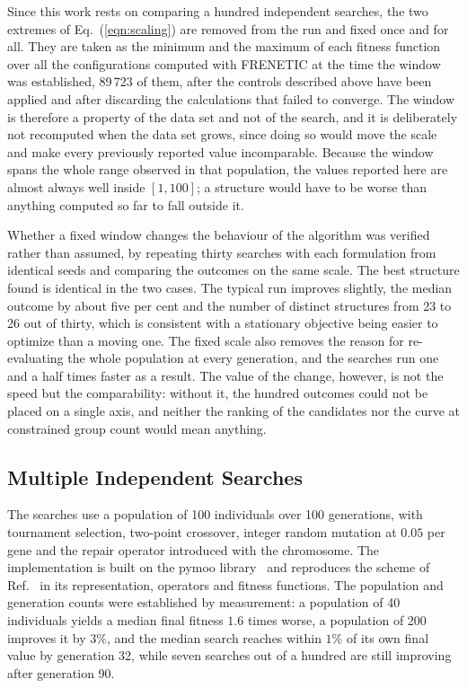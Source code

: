 \documentclass{style/nseJournal}
\begin{document}
Since this work rests on comparing a hundred independent searches, the two
extremes of Eq.~(\ref{eqn:scaling}) are removed from the run and fixed once and
for all. They are taken as the minimum and the maximum of each fitness function
over all the configurations computed with FRENETIC at the time the window was
established, 89\,723 of them, after the controls described above have been
applied and after discarding the calculations that failed to converge. The
window is therefore a property of the data set and not of the search, and it is
deliberately not recomputed when the data set grows, since doing so would move
the scale and make every previously reported value incomparable. Because the
window spans the whole range observed in that population, the values reported
here are almost always well inside $[1,100]$; a structure would have to be worse
than anything computed so far to fall outside it.

Whether a fixed window changes the behaviour of the algorithm was verified
rather than assumed, by repeating thirty searches with each formulation from
identical seeds and comparing the outcomes on the same scale. The best structure
found is identical in the two cases. The typical run improves slightly, the
median outcome by about five per cent and the number of distinct structures from
23 to 26 out of thirty, which is consistent with a stationary objective being
easier to optimize than a moving one. The fixed scale also removes the reason
for re-evaluating the whole population at every generation, and the searches run
one and a half times faster as a result. The value of the change, however, is
not the speed but the comparability: without it, the hundred outcomes could not
be placed on a single axis, and neither the ranking of the candidates nor the
curve at constrained group count would mean anything.

\subsection{Multiple Independent Searches}

The searches use a population of 100 individuals over 100 generations, with
tournament selection, two-point crossover, integer random mutation at $0.05$ per
gene and the repair operator introduced with the chromosome. The
implementation is built on the pymoo library~\cite{pymoo} and reproduces the
scheme of Ref.~\cite{prevMulti} in its representation, operators and fitness
functions. The population and generation counts were established by
measurement: a population of 40 individuals yields a median final fitness $1.6$
times worse, a population of 200 improves it by $3\%$, and the median search
reaches within $1\%$ of its own final value by generation 32, while seven
searches out of a hundred are still improving after generation 90.
\end{document}
